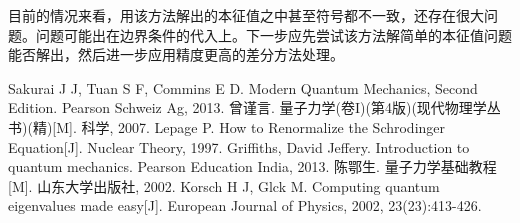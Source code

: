 \documentclass[hyperref]{ctexart}
\begin{document}
目前的情况来看，用该方法解出的本征值之中甚至符号都不一致，还存在很大问题。问题可能出在边界条件的代入上。下一步应先尝试该方法解简单的本征值问题能否解出，然后进一步应用精度更高的差分方法处理。
\begin{thebibliography}{b}

Sakurai J J, Tuan S F, Commins E D. Modern Quantum Mechanics, Second Edition. Pearson Schweiz Ag, 2013.
曾谨言. 量子力学(卷I)(第4版)(现代物理学丛书)(精)[M]. 科学, 2007.
Lepage P. How to Renormalize the Schrodinger Equation[J]. Nuclear Theory, 1997.
Griffiths, David Jeffery. Introduction to quantum mechanics. Pearson Education India, 2013.
陈鄂生. 量子力学基础教程[M]. 山东大学出版社, 2002.
Korsch H J, Glck M. Computing quantum eigenvalues made easy[J]. European Journal of Physics, 2002, 23(23):413-426.
\end{thebibliography}
\end{document}
